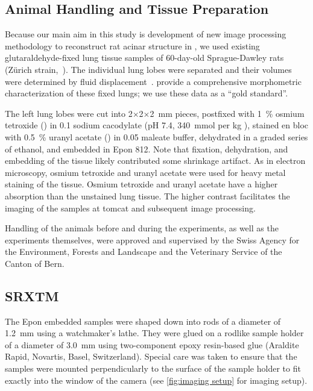 \subsection[Animal Handling]{Animal Handling and Tissue Preparation}
Because our main aim in this study is development of new image processing methodology to reconstruct rat acinar structure in \threed, we used existing glutaraldehyde-fixed lung tissue samples of 60-day-old Sprague-Dawley rats (Zürich strain,~\cite{Tschanz2003}). The individual lung lobes were separated and their volumes were determined by fluid displacement~\cite{Scherle1970}. \citet{Tschanz2003} provide a comprehensive morphometric characterization of these fixed lungs; we use these data as a ``gold standard''.

The left lung lobes were cut into 2$\times$2$\times$\SI{2}{\milli\meter} pieces, postfixed with \SI{1}{\percent} osmium tetroxide () in \SI{0.1}{\Molar} sodium cacodylate (pH 7.4, \SI{340}{\mmol} per \si{\kilogram} ), stained en bloc with \SI{0.5}{\percent} uranyl acetate () in \SI{0.05}{\Molar} maleate buffer, dehydrated in a graded series of ethanol, and embedded in Epon 812. Note that fixation, dehydration, and embedding of the tissue likely contributed some shrinkage artifact. As in electron microscopy, osmium tetroxide and uranyl acetate were used for heavy metal staining of the tissue. Osmium tetroxide and uranyl acetate have a higher absorption than the unstained lung tissue. The higher contrast facilitates the imaging of the samples at \ac{tomcat} and subsequent image processing.

Handling of the animals before and during the experiments, as well as the experiments themselves, were approved and supervised by the Swiss Agency for the Environment, Forests and Landscape and the Veterinary Service of the Canton of Bern.

\subsection{SRXTM}
The Epon embedded samples were shaped down into rods of a diameter of \SI{1.2}{\milli\meter} using a watchmaker's lathe. They were glued on a rodlike sample holder of a diameter of \SI{3.0}{\milli\meter} using two-component epoxy resin-based glue (Araldite Rapid, Novartis, Basel, Switzerland). Special care was taken to ensure that the samples were mounted perpendicularly to the surface of the sample holder to fit exactly into the window of the camera (see \autoref{fig:imaging setup} for imaging setup).

